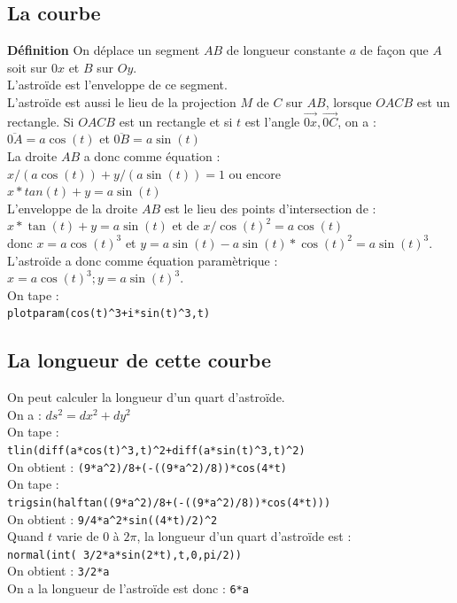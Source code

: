 \documentclass[a4paper,11pt]{book}
\begin{document}
\subsection{La courbe}
{\bf D\'efinition} On d\'eplace un segment $AB$ de longueur constante $a$ 
de fa\c{c}on que $A$ soit sur $0x$ et $B$ sur $Oy$.\\
L'astro\"ide est l'enveloppe de ce segment. \\
L'astro\"ide est aussi le lieu de la 
projection $M$ de $C$ sur $AB$, lorsque $OACB$ est un rectangle.
Si  $OACB$ est un rectangle et si $t$ est l'angle 
$\overrightarrow{0x},\overrightarrow{0C}$, on a :\\
$\overline{0A}=a\cos(t)$ et
$\overline{0B}=a\sin(t)$\\
La droite $AB$ a donc comme \'equation :\\
$x/(a\cos(t))+y/(a\sin(t))=1$ ou encore \\
$x*tan(t)+y=a\sin(t)$\\
L'enveloppe de la droite $AB$ est le lieu des points d'intersection de :\\
$x*\tan(t)+y=a\sin(t)$ et de $x/\cos(t)^2=a\cos(t)$\\
donc $x=a\cos(t)^3$ et $y=a\sin(t)-a\sin(t)*\cos(t)^2=a\sin(t)^3$.\\
L'astro\"ide a donc comme \'equation param\`etrique :
$x=a\cos(t)^3;y=a\sin(t)^3$.\\
On tape :\\
{\tt plotparam(cos(t)\verb|^|3+i*sin(t)\verb|^|3,t)}

\subsection{La longueur de cette courbe}
On peut calculer la longueur d'un quart d'astro\"ide.\\
On a : $ds^2=dx^2+dy^2$\\
On tape :\\
{\tt tlin(diff(a*cos(t)\verb|^|3,t)\verb|^|2+diff(a*sin(t)\verb|^|3,t)\verb|^|2)}\\
On obtient :
{\tt (9*a\verb|^|2)/8+(-((9*a\verb|^|2)/8))*cos(4*t)}\\
On tape :\\
{\tt trigsin(halftan((9*a\verb|^|2)/8+(-((9*a\verb|^|2)/8))*cos(4*t)))}\\
On obtient :
{\tt 9/4*a\verb|^|2*sin((4*t)/2)\verb|^|2}\\
Quand $t$ varie de 0 \`a $2\pi$, la longueur d'un quart d'astro\"ide est :\\
{\tt normal(int( 3/2*a*sin(2*t),t,0,pi/2))}\\
On obtient :
{\tt 3/2*a}\\
On a la longueur de l'astro\"ide est donc :
{\tt 6*a}
\end{document}
